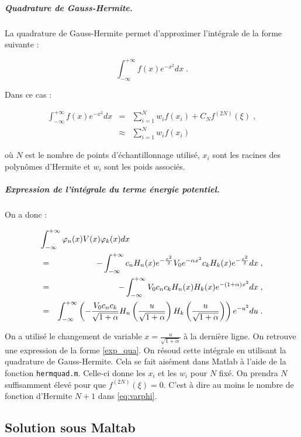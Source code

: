 \documentclass{report}
\begin{document}
\subparagraph{Quadrature de Gauss-Hermite.}

La quadrature de Gauss-Hermite permet d'approximer l'intégrale de la forme suivante :

\begin{equation}\label{exp_qua}
\int_{-\infty}^{+\infty} f(x) e^{-x^{2}} dx\;.
\end{equation}

Dans ce cas :

\begin{eqnarray}
\int_{-\infty}^{+\infty} f(x) e^{-x^{2}} dx & = & \sum_{i=1}^N w_i f(x_i)+C_{N}f^{(2N)}(\xi) \;,\\
& \approx & \sum_{i=1}^N w_i f(x_i)
\end{eqnarray}

où $N$ est le nombre de points d'échantillonnage utilisé, $x_i$ sont les racines des polynômes d'Hermite et $w_i$ sont les poids associés.

\subparagraph{Expression de l'intégrale du terme énergie potentiel.}

On a donc :

\begin{eqnarray}
\lefteqn{\int_{-\infty}^{+\infty} \varphi_n(x) V(x) \varphi_k(x) dx }\\
&=& - \int_{-\infty}^{+\infty} c_{n} H_{n}(x)e^{-\frac{x^{2}}{2}} V_{0}e^{-\alpha x^{2}} c_{k} H_{k}(x)e^{-\frac{x^{2}}{2}} dx\;,\\
 &=& - \int_{-\infty}^{+\infty} V_{0} c_{n} c_{k} H_{n}(x) H_{k}(x) e^{-\left(1+\alpha \right)x^{2}} dx\;,\\
 &=&  \int_{-\infty}^{+\infty} \left( - \frac{V_{0} c_{n} c_{k}}{\sqrt{1+\alpha}} H_{n}\left(\frac{u}{\sqrt{1+\alpha}}\right) H_{k}\left(\frac{u}{\sqrt{1+\alpha}}\right) \right) e^{-u^{2}} du\;.
\end{eqnarray}

On a utilisé le changement de variable $x = \frac{u}{\sqrt{1+\alpha}}$ à la dernière ligne. On retrouve une expression de la forme \eqref{exp_qua}. On résoud cette intégrale en utilisant la quadrature de Gauss-Hermite. Cela se fait aisément dans Matlab à l'aide de la fonction \texttt{hermquad.m}. Celle-ci donne les $x_i$ et les $w_i$ pour $N$ fixé. On prendra $N$ suffisamment élevé pour que $f^{(2N)}(\xi) = 0$. C'est à dire au moins le nombre de fonction d'Hermite $N+1$ dans \eqref{eq:varphi}. 

\subsection{Solution sous Maltab}
\end{document}

